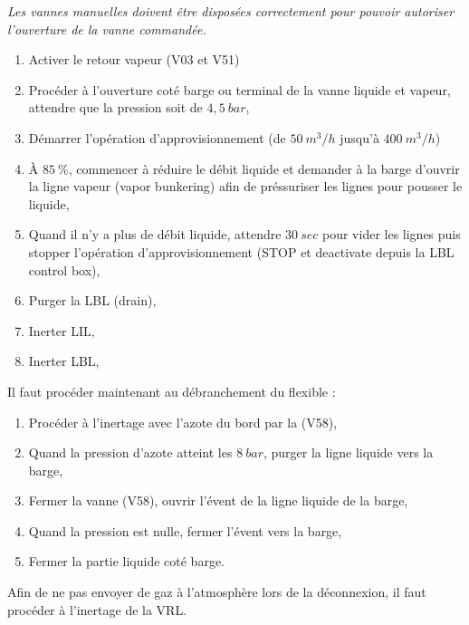 \documentclass[12pt,a4paper]{article}
\begin{document}
\emph{Les vannes manuelles doivent être disposées correctement pour pouvoir 
autoriser l'ouverture de la vanne commandée.}

\begin{enumerate}[resume]
 \item Activer le retour vapeur (V03 et V51)
 \item Procéder à l'ouverture coté barge ou terminal de la vanne liquide et vapeur, attendre que la pression soit de $4,5~bar$,
 \item Démarrer l'opération d'approvisionnement (de $50~m^3/h$ jusqu'à 
$400~m^3/h$)
 \item À $85~\%$, commencer à réduire le débit liquide et demander à la barge d'ouvrir la ligne vapeur (vapor bunkering) afin de préssuriser les lignes pour pousser le liquide,
 \item Quand il n'y a plus de débit liquide, attendre $30~sec$ pour vider les lignes puis stopper l'opération d'approvisionnement (STOP et deactivate depuis la LBL control box), 
 \item Purger la LBL (drain),
 \item Inerter LIL,
 \item Inerter LBL,
\end{enumerate}
 Il faut procéder maintenant au débranchement du flexible :
 
\begin{enumerate}[resume]
 \item Procéder à l'inertage avec l'azote du bord par la (V58), 
 \item Quand la pression d'azote atteint les $8~bar$, purger la ligne liquide 
vers la barge,
 \item Fermer la vanne (V58), ouvrir l'évent de la ligne liquide de la barge,
 \item Quand la pression est nulle, fermer l'évent vers la barge,
 \item Fermer la partie liquide coté barge.
\end{enumerate}
Afin de ne pas envoyer de gaz à l'atmosphère lors de la déconnexion, il faut 
procéder à l'inertage de la VRL.
\end{document}
